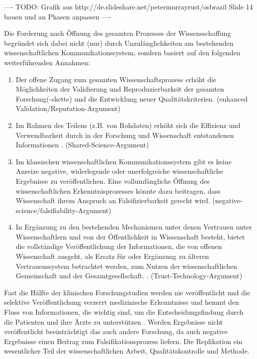 ---- TODO: Grafik aus http://de.slideshare.net/petermurrayrust/osbrazil Slide 14 bauen und an Phasen anpassen ----

Die Forderung nach Öffnung des gesamten Prozesses der Wissensschaffung begründet sich dabei nicht (nur) durch Unzulänglichkeiten am bestehenden wissenschaftlichen Kommunikationssystem, sondern basiert auf den folgenden weiterführenden Annahmen:
\begin{enumerate}
\item Der offene Zugang zum gesamten Wissenschaftsprozess erhöht die Möglichkeiten der Validierung und Reproduzierbarkeit der gesamten Forschung(-skette) \cite{Aleksic_2014} \cite{Krumholz_2014} \cite{hey_2015_open} und die Entwicklung neuer Qualitätskriterien. (enhanced Validation/Reputation-Argument)
\item Im Rahmen des Teilens (z.B. von Rohdaten) erhöht sich die Effizienz und Verwendbarkeit durch in der Forschung und Wissenschaft entstandenen Informationen \cite{Fecher_2015}. (Shared-Science-Argument)
\item Im klassischen wissenschaftlichen Kommunikationssystem gibt es keine Anreize negative, widerlegende oder unerfolgreiche wissenschaftliche Ergebnisse zu veröffentlichen. Eine vollumfängliche Öffnung des wissenschaftlichen Erkenntnisprozesses könnte dazu beitragen, dass Wissenschaft ihrem Anspruch an Falsifizierbarkeit gerecht wird. (negative-science/falsifiability-Argument)
\item In Ergänzung zu den bestehenden Mechanismen unter denen Vertrauen unter Wissenschaftlern und von der Öffentlichkeit in Wissenschaft besteht, bietet die vollständige Veröffentlichung der Informationen, die von offenen Wissenschaft ausgeht, als Ersatz für oder Ergänzung zu älteren Vertrauenssystem betrachtet werden, zum Nutzen der wissenschaftlichen Gemeinschaft und der Gesamtgesellschaft. \cite{grand_2012_open}.  (Trust-Technology-Argument)
\end{enumerate}

Fast die Hälfte der klinischen Forschungstudien werden nie veröffentlicht und die selektive Veröffentlichung verzerrt medizinische Erkenntnisse und hemmt den Fluss von Informationen, die wichtig sind, um die Entscheidungsfindung durch die Patienten und ihre Ärzte zu unterstützen \cite{Ross_2013}. Werden Ergebnisse nicht veröffentlicht beeinträchtigt das auch andere Forschung, da auch negative Ergebnisse einen Beitrag zum Falsifikationsprozess liefern. Die Replikation ein wesentlicher Teil der wissenschaftlichen Arbeit, Qualitätskontrolle und Methode.

